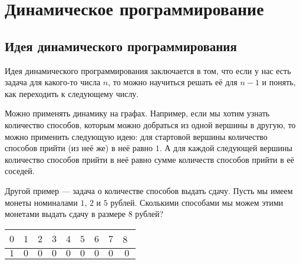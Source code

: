 \section{Динамическое программирование}

\subsection{Идея динамического программирования}

Идея динамического программирования заключается в том, что если у нас есть задача для какого-то числа $n$, то можно научиться решать её для $n - 1$ и понять, как переходить к следующему числу. 

Можно применять динамику на графах. Например, если мы хотим узнать количество способов, которым можно добраться из одной вершины в другую, то можно применить следующую идею: для стартовой вершины количество способов прийти (из неё же) в неё равно $1$. А для каждой следующей вершины количество способов прийти в неё равно сумме количеств способов прийти в её соседей.

Другой пример --- задача о количестве способов выдать сдачу. Пусть мы имеем монеты номиналами $1$, $2$ и $5$ рублей. Сколькими способами мы можем этими монетами выдать сдачу в размере $8$ рублей?

\begin{center}
\begin{tabular}{| c | c | c | c | c | c | c | c | c |}
    \rowcolor{lightgray}
    \hspace{.1cm} $0$ \hspace{.1cm} & \hspace{.1cm} $1$ \hspace{.1cm} & \hspace{.1cm} $2$ \hspace{.1cm} & \hspace{.1cm} $3$ \hspace{.1cm} & \hspace{.1cm} $4$ \hspace{.1cm} & \hspace{.1cm} $5$ \hspace{.1cm} & \hspace{.1cm} $6$ \hspace{.1cm} & \hspace{.1cm} $7$ \hspace{.1cm} & \hspace{.1cm} $8$ \hspace{.005cm} ${}$\\
    \hline
    $1$ & $0$ & $0$ & $0$ & $0$ & $0$ & $0$ & $0$ & $0$\\
\end{tabular}
\end{center}

